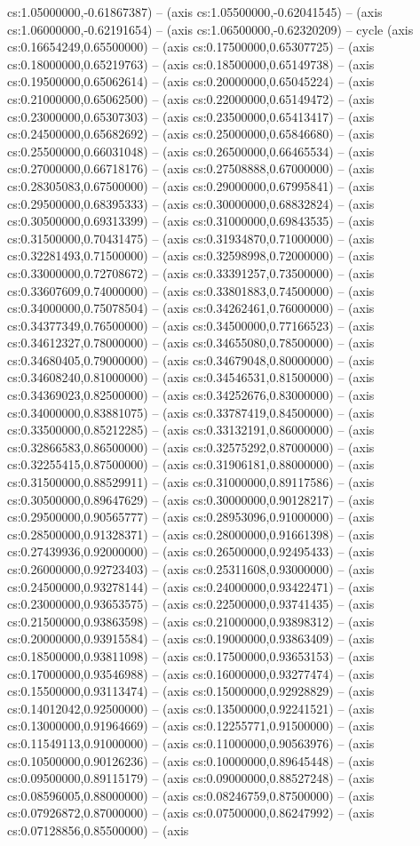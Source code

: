 cs:1.05000000,-0.61867387) -- (axis cs:1.05500000,-0.62041545) -- (axis cs:1.06000000,-0.62191654) -- (axis cs:1.06500000,-0.62320209) -- cycle (axis cs:0.16654249,0.65500000) -- (axis cs:0.17500000,0.65307725) -- (axis cs:0.18000000,0.65219763) -- (axis cs:0.18500000,0.65149738) -- (axis cs:0.19500000,0.65062614) -- (axis cs:0.20000000,0.65045224) -- (axis cs:0.21000000,0.65062500) -- (axis cs:0.22000000,0.65149472) -- (axis cs:0.23000000,0.65307303) -- (axis cs:0.23500000,0.65413417) -- (axis cs:0.24500000,0.65682692) -- (axis cs:0.25000000,0.65846680) -- (axis cs:0.25500000,0.66031048) -- (axis cs:0.26500000,0.66465534) -- (axis cs:0.27000000,0.66718176) -- (axis cs:0.27508888,0.67000000) -- (axis cs:0.28305083,0.67500000) -- (axis cs:0.29000000,0.67995841) -- (axis cs:0.29500000,0.68395333) -- (axis cs:0.30000000,0.68832824) -- (axis cs:0.30500000,0.69313399) -- (axis cs:0.31000000,0.69843535) -- (axis cs:0.31500000,0.70431475) -- (axis cs:0.31934870,0.71000000) -- (axis cs:0.32281493,0.71500000) -- (axis cs:0.32598998,0.72000000) -- (axis cs:0.33000000,0.72708672) -- (axis cs:0.33391257,0.73500000) -- (axis cs:0.33607609,0.74000000) -- (axis cs:0.33801883,0.74500000) -- (axis cs:0.34000000,0.75078504) -- (axis cs:0.34262461,0.76000000) -- (axis cs:0.34377349,0.76500000) -- (axis cs:0.34500000,0.77166523) -- (axis cs:0.34612327,0.78000000) -- (axis cs:0.34655080,0.78500000) -- (axis cs:0.34680405,0.79000000) -- (axis cs:0.34679048,0.80000000) -- (axis cs:0.34608240,0.81000000) -- (axis cs:0.34546531,0.81500000) -- (axis cs:0.34369023,0.82500000) -- (axis cs:0.34252676,0.83000000) -- (axis cs:0.34000000,0.83881075) -- (axis cs:0.33787419,0.84500000) -- (axis cs:0.33500000,0.85212285) -- (axis cs:0.33132191,0.86000000) -- (axis cs:0.32866583,0.86500000) -- (axis cs:0.32575292,0.87000000) -- (axis cs:0.32255415,0.87500000) -- (axis cs:0.31906181,0.88000000) -- (axis cs:0.31500000,0.88529911) -- (axis cs:0.31000000,0.89117586) -- (axis cs:0.30500000,0.89647629) -- (axis cs:0.30000000,0.90128217) -- (axis cs:0.29500000,0.90565777) -- (axis cs:0.28953096,0.91000000) -- (axis cs:0.28500000,0.91328371) -- (axis cs:0.28000000,0.91661398) -- (axis cs:0.27439936,0.92000000) -- (axis cs:0.26500000,0.92495433) -- (axis cs:0.26000000,0.92723403) -- (axis cs:0.25311608,0.93000000) -- (axis cs:0.24500000,0.93278144) -- (axis cs:0.24000000,0.93422471) -- (axis cs:0.23000000,0.93653575) -- (axis cs:0.22500000,0.93741435) -- (axis cs:0.21500000,0.93863598) -- (axis cs:0.21000000,0.93898312) -- (axis cs:0.20000000,0.93915584) -- (axis cs:0.19000000,0.93863409) -- (axis cs:0.18500000,0.93811098) -- (axis cs:0.17500000,0.93653153) -- (axis cs:0.17000000,0.93546988) -- (axis cs:0.16000000,0.93277474) -- (axis cs:0.15500000,0.93113474) -- (axis cs:0.15000000,0.92928829) -- (axis cs:0.14012042,0.92500000) -- (axis cs:0.13500000,0.92241521) -- (axis cs:0.13000000,0.91964669) -- (axis cs:0.12255771,0.91500000) -- (axis cs:0.11549113,0.91000000) -- (axis cs:0.11000000,0.90563976) -- (axis cs:0.10500000,0.90126236) -- (axis cs:0.10000000,0.89645448) -- (axis cs:0.09500000,0.89115179) -- (axis cs:0.09000000,0.88527248) -- (axis cs:0.08596005,0.88000000) -- (axis cs:0.08246759,0.87500000) -- (axis cs:0.07926872,0.87000000) -- (axis cs:0.07500000,0.86247992) -- (axis cs:0.07128856,0.85500000) -- (axis 